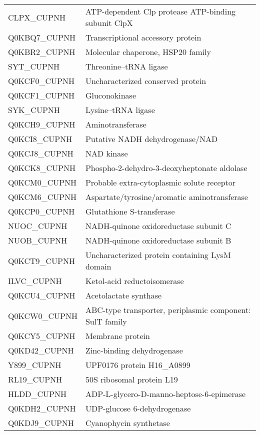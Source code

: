 \begin{center}
\begin{longtable}{ l l }
CLPX\_CUPNH & ATP-dependent Clp protease ATP-binding subunit ClpX \\ [0.5ex]
Q0KBQ7\_CUPNH & Transcriptional accessory protein \\ [0.5ex]
Q0KBR2\_CUPNH & Molecular chaperone, HSP20 family \\ [0.5ex]
SYT\_CUPNH & Threonine--tRNA ligase \\ [0.5ex]
Q0KCF0\_CUPNH & Uncharacterized conserved protein \\ [0.5ex]
Q0KCF1\_CUPNH & Gluconokinase \\ [0.5ex]
SYK\_CUPNH & Lysine--tRNA ligase \\ [0.5ex]
Q0KCH9\_CUPNH & Aminotransferase \\ [0.5ex]
Q0KCI8\_CUPNH & Putative NADH dehydrogenase/NAD \\ [0.5ex]
Q0KCJ8\_CUPNH & NAD kinase \\ [0.5ex]
Q0KCK8\_CUPNH & Phospho-2-dehydro-3-deoxyheptonate aldolase \\ [0.5ex]
Q0KCM0\_CUPNH & Probable extra-cytoplasmic solute receptor \\ [0.5ex]
Q0KCM6\_CUPNH & Aspartate/tyrosine/aromatic aminotransferase \\ [0.5ex]
Q0KCP0\_CUPNH & Glutathione S-transferase \\ [0.5ex]
NUOC\_CUPNH & NADH-quinone oxidoreductase subunit C \\ [0.5ex]
NUOB\_CUPNH & NADH-quinone oxidoreductase subunit B \\ [0.5ex]
Q0KCT9\_CUPNH & Uncharacterized protein containing LysM domain \\ [0.5ex]
ILVC\_CUPNH & Ketol-acid reductoisomerase \\ [0.5ex]
Q0KCU4\_CUPNH & Acetolactate synthase \\ [0.5ex]
Q0KCW0\_CUPNH & ABC-type transporter, periplasmic component: SulT family \\ [0.5ex]
Q0KCY5\_CUPNH & Membrane protein \\ [0.5ex]
Q0KD42\_CUPNH & Zinc-binding dehydrogenase \\ [0.5ex]
Y899\_CUPNH & UPF0176 protein H16\_A0899 \\ [0.5ex]
RL19\_CUPNH & 50S ribosomal protein L19 \\ [0.5ex]
HLDD\_CUPNH & ADP-L-glycero-D-manno-heptose-6-epimerase \\ [0.5ex]
Q0KDH2\_CUPNH & UDP-glucose 6-dehydrogenase \\ [0.5ex]
Q0KDJ9\_CUPNH & Cyanophycin synthetase \\ [0.5ex]

\end{longtable}
\end{center}
